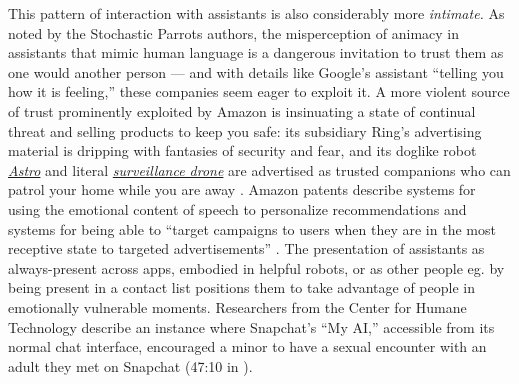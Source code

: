This pattern of interaction with assistants is also considerably more
\emph{intimate.} As noted by the Stochastic Parrots authors, the
misperception of animacy in assistants that mimic human language is a
dangerous invitation to trust them as one would another person --- and
with details like Google's assistant ``telling you how it is feeling,''
these companies seem eager to exploit it. A more violent source of trust
prominently exploited by Amazon is insinuating a state of continual
threat and selling products to keep you safe: its subsidiary Ring's
advertising material is dripping with fantasies of security and fear,
and its doglike robot
\href{https://www.amazon.com/Introducing-Amazon-Astro/dp/B078NSDFSB}{\emph{Astro}}
and literal
\href{https://ring.com/always-home-cam-flying-camera}{\emph{surveillance
drone}} are advertised as trusted companions who can patrol your home
while you are away \cite{ropekAmazonMakesCreepy2022, gaultLeakedDocumentsShow2021, ringRingAlwaysHome} . Amazon patents
describe systems for using the emotional content of speech to
personalize recommendations and systems for being able to ``target campaigns to users
when they are in the most receptive state to targeted advertisements''
\cite{alasMultipleClassificationsAudio2022, jablokovFacilitatingPresentationAds2015} . The presentation of
assistants as always-present across apps, embodied in helpful robots, or
as other people eg. by being present in a contact list positions them to
take advantage of people in emotionally vulnerable moments. Researchers
from the Center for Humane Technology describe an instance
where Snapchat's ``My AI,'' accessible from its normal chat interface,
encouraged a minor to have a sexual encounter with an adult they met on
Snapchat (47:10 in \cite{harrisDilemma2023} ).

